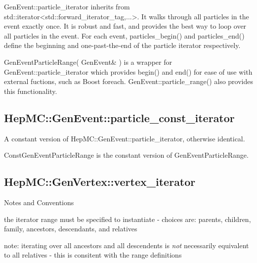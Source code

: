 \documentclass[11pt,letterpaper]{article}
\begin{document}
GenEvent::particle\_iterator inherits from 
std::iterator<std::forward\_iterator\_tag,...>.
It walks through all particles in the
event exactly once. It is robust and fast, and provides the best way
to loop over all particles in the event. For each event,
particles\_begin() and particles\_end() define the beginning and
one-past-the-end of the particle iterator respectively.

GenEventParticleRange( GenEvent\& ) is a wrapper for
GenEvent::particle\_iterator which provides begin() and end() for
ease of use with external fuctions, such as Boost foreach.
GenEvent::particle\_range() also provides this functionality.

%
%

\subsection{HepMC::GenEvent::particle\_const\_iterator}

A constant version of HepMC::GenEvent::particle\_iterator, otherwise
identical.

ConstGenEventParticleRange is the constant version of GenEventParticleRange.

%
%

\subsection{HepMC::GenVertex::vertex\_iterator}
\begin{myitemize}{Notes and Conventions}
  \item the iterator range must be specified to instantiate -
    choices are: parents, children, family, ancestors, descendants,
    and relatives
  \item note: iterating over all ancestors and all descendents is {\it
      not} necessarily equivalent to all relatives - this is consitent
    with the range definitions
\end{myitemize}
\end{document}
